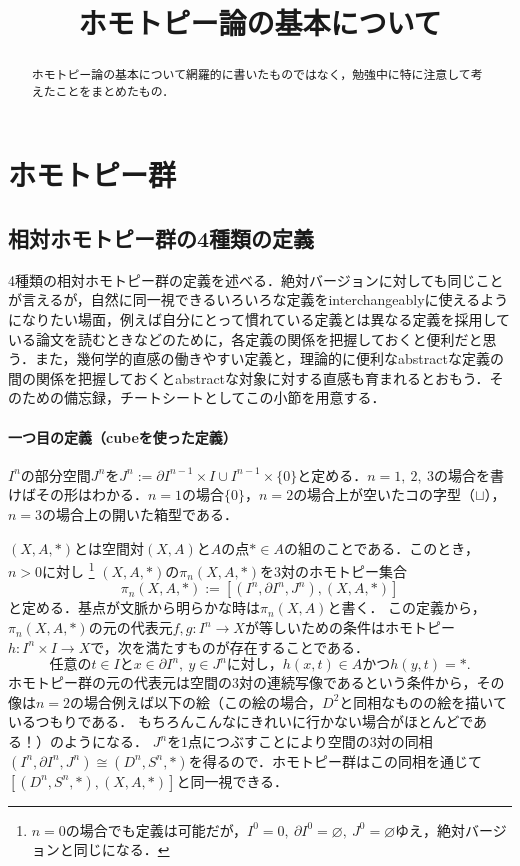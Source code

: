 \documentclass[a4paper,11pt]{jsarticle}
\begin{document}
\date{}
\title{ホモトピー論の基本について}

\maketitle
\begin{abstract}
  ホモトピー論の基本について網羅的に書いたものではなく，勉強中に特に注意して考えたことをまとめたもの．
\end{abstract}
\tableofcontents
\section{ホモトピー群}
\subsection{相対ホモトピー群の4種類の定義}
4種類の相対ホモトピー群の定義を述べる．絶対バージョンに対しても同じことが言えるが，自然に同一視できるいろいろな定義をinterchangeablyに使えるようになりたい場面，例えば自分にとって慣れている定義とは異なる定義を採用している論文を読むときなどのために，各定義の関係を把握しておくと便利だと思う．また，幾何学的直感の働きやすい定義と，理論的に便利なabstractな定義の間の関係を把握しておくとabstractな対象に対する直感も育まれるとおもう．そのための備忘録，チートシートとしてこの小節を用意する．
\paragraph{一つ目の定義（cubeを使った定義）}
$I^n$の部分空間$J^n$を$J^n:=\partial I^{n-1}\times I\cup I^{n-1}\times\{0\}$と定める．$n=1,\ 2,\ 3$の場合を書けばその形はわかる．$n=1$の場合$\{0\}$，$n=2$の場合上が空いたコの字型（$\sqcup$），$n=3$の場合上の開いた箱型である．

$(X,A,*)$とは空間対$(X,A)$と$A$の点$*\in A$の組のことである．このとき，$n>0$に対し
\footnote{$n=0$の場合でも定義は可能だが，$I^0={0},\ \partial I^0=\varnothing,\ J^0=\varnothing$ゆえ，絶対バージョンと同じになる．}
$(X,A,*)$の$\pi_n(X,A,*)$を3対のホモトピー集合\[
  \pi_n(X,A,*):=[(I^n,\partial I^n,J^n),(X,A,*)]
\]と定める．基点が文脈から明らかな時は$\pi_n(X,A)$と書く．
この定義から，$\pi_n(X,A,*)$の元の代表元$f,g\colon I^n\to X$が等しいための条件はホモトピー$h\colon I^n\times I\to X$で，次を満たすものが存在することである．\[
  任意のt\in Iとx\in \partial I^n,\ y\in J^nに対し，h(x,t)\in Aかつh(y,t)=*.
\]
ホモトピー群の元の代表元は空間の3対の連続写像であるという条件から，その像は$n=2$の場合例えば以下の絵（この絵の場合，$D^2$と同相なものの絵を描いているつもりである．
もちろんこんなにきれいに行かない場合がほとんどである！）のようになる．
$J^n$を1点につぶすことにより空間の3対の同相$(I^n,\partial I^n,J^n)\cong(D^n,S^n,*)$を得るので．ホモトピー群はこの同相を通じて$[(D^n,S^n,*),(X,A,*)]$と同一視できる．
\end{document}
